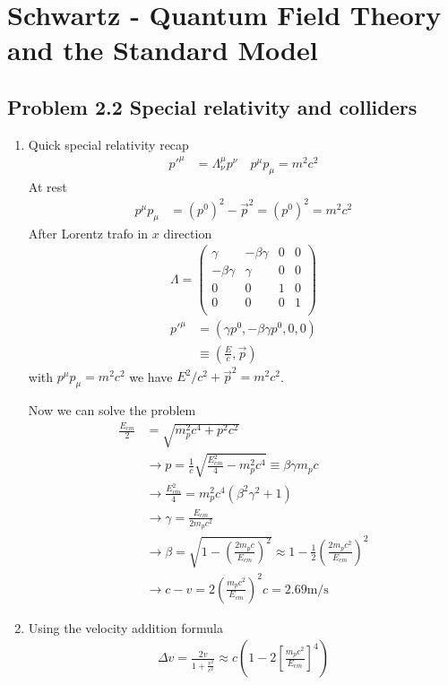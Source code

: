 \documentclass[../main.tex]{subfiles}
\begin{document}
\section{{\sc Schwartz} - Quantum Field Theory and the Standard Model}
\subsection{Problem 2.2 Special relativity and colliders}
\begin{enumerate}
    \item Quick special relativity recap
    \begin{align}
        p'^\mu&=\Lambda^\mu_\nu p^\nu\quad p^\mu p_\mu=m^2c^2
    \end{align}
    At rest
    \begin{align}
        p^\mu p_\mu&=(p^0)^2-\vec{p}^2=(p^0)^2=m^2c^2
    \end{align}
    After Lorentz trafo in $x$ direction
    \begin{align}
        \Lambda=\begin{pmatrix}
        \gamma & -\beta\gamma & 0 & 0\\
        -\beta\gamma & \gamma & 0 & 0\\
        0 & 0 & 1 & 0\\
        0 & 0 & 0 & 1\\
        \end{pmatrix}
    \end{align}
    \begin{align}
        p'^\mu&=(\gamma p^0,-\beta\gamma p^0,0,0)\\
        &\equiv\left(\frac{E}{c},\vec{p}\right)
    \end{align}
    with $p^\mu p_\mu=m^2c^2$ we have $E^2/c^2+\vec{p}^2=m^2c^2$.
    
    Now we can solve the problem
    \begin{align}
        \frac{E_{cm}}{2}&=\sqrt{m_p^2c^4+p^2c^2}\\
        &\rightarrow p = \frac{1}{c}\sqrt{\frac{E_{cm}^2}{4}-m_p^2c^4}\equiv\beta\gamma m_pc\\
        &\rightarrow \frac{E_{cm}^2}{4}=m_p^2c^4(\beta^2\gamma^2+1)\\
        &\rightarrow \gamma=\frac{E_{cm}}{2m_pc^2}\\
        &\rightarrow\beta=\sqrt{1-\left(\frac{2m_pc}{E_{cm}}\right)^2}\approx1-\frac{1}{2}\left(\frac{2m_pc^2}{E_{cm}}\right)^2\\
        &\rightarrow c-v=2\left(\frac{m_pc^2}{E_{cm}}\right)^2c=2.69\text{m/s}
    \end{align}
    \item Using the velocity addition formula
    \begin{align}
        \Delta v=\frac{2v}{1+\frac{v^2}{c^2}}\approx c\left(1-2\left[\frac{m_pc^2}{E_{cm}}\right]^4\right)
    \end{align}
\end{enumerate}
\end{document}
